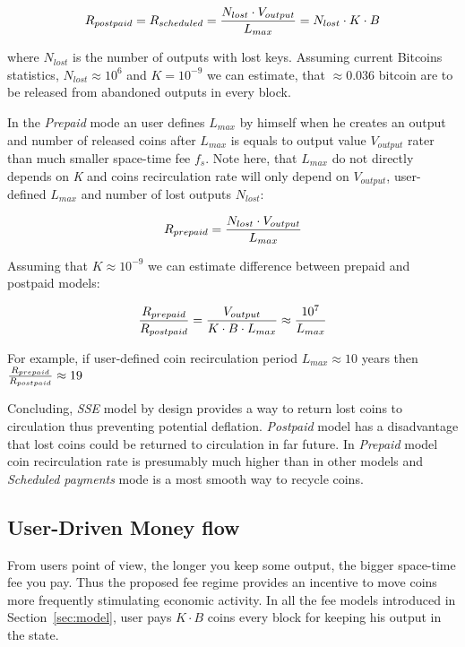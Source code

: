 \documentclass[]{llncs}   %
\newcommand{\esse}{\textit{SSE}}
\begin{document}
\begin{equation}
R_{postpaid} = R_{scheduled} = {N_{lost} \cdot V_{output} \over L_{max}} = {N_{lost} \cdot K \cdot B}
\end{equation}

where $N_{lost}$ is the number of outputs with lost keys. Assuming current Bitcoins statistics, $N_{lost}\approx10^6$ and $K = 10^{-9}$ we can estimate, that $\approx0.036$ bitcoin are to be released from abandoned outputs in every block.

In the \textit{Prepaid} mode an user defines $L_{max}$ by himself when he creates an output and number of released coins after $L_{max}$ is equals to output value $V_{output}$ rater than much smaller space-time fee $f_s$. Note here, that $L_{max}$ do not directly depends on \textit{K} and coins recirculation rate will only depend on $V_{output}$, user-defined $L_{max}$ and number of lost outputs $N_{lost}$:

\begin{equation}
R_{prepaid} = {N_{lost} \cdot V_{output} \over L_{max}}
\end{equation}

Assuming that $K\approx10^{-9}$ we can estimate difference between prepaid and postpaid models:

\begin{equation}
{R_{prepaid} \over R_{postpaid}} = {V_{output} \over  K \cdot B \cdot L_{max}} \approx {10^7 \over L_{max}}
\end{equation}

For example, if user-defined coin recirculation period $L_{max}\approx10$ years then ${R_{prepaid} \over R_{postpaid}} \approx 19$

Concluding, \esse{} model by design provides a way to return lost coins to circulation thus preventing potential deflation. \textit{Postpaid} model has a disadvantage  that lost coins could be returned to circulation in far future. In \textit{Prepaid} model coin recirculation rate is presumably much higher than in other models and \textit{Scheduled payments} mode is a most smooth way to recycle coins.



\subsection{User-Driven Money flow}
\label{sec:flow}

From users point of view, the longer you keep some output, the bigger space-time fee you pay. Thus the proposed fee regime provides an incentive to move coins more frequently stimulating economic activity. In all the fee models introduced in Section~\ref{sec:model}, user pays ${K \cdot B}$ coins every block for keeping his output in the state. 
\end{document}

